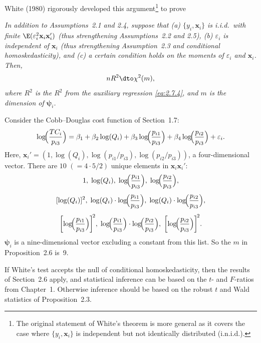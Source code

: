 White (1980) rigorously developed this argument\footnote{The original statement of
White's theorem is more general as it covers the case where $\{y_i, \mathbf{x}_i\}$ is
independent but not identically distributed (i.n.i.d.).} to prove

\begin{proposition}
\label{prop:2.6}
\emph{In addition to Assumptions~2.1 and 2.4, suppose that
\textup{(a)} $\{y_i, \mathbf{x}_i\}$ is i.i.d.\ with finite
$\E(\varepsilon_i^2 \mathbf{x}_i \mathbf{x}_i')$
\textup{(}thus strengthening Assumptions~2.2 and 2.5\textup{)},
\textup{(b)} $\varepsilon_i$ is independent of $\mathbf{x}_i$
\textup{(}thus strengthening Assumption~2.3 and conditional homoskedasticity\textup{)},
and \textup{(c)} a certain condition holds on the moments of $\varepsilon_i$ and
$\mathbf{x}_i$.  Then,}
\[
  nR^2 \dto \chi^2(m),
\]
\emph{where $R^2$ is the $R^2$ from the auxiliary regression \eqref{eq:2.7.4}, and $m$
is the dimension of $\bm{\psi}_i$.}
\end{proposition}

\begin{example}
\label{ex:2.7}
Consider the Cobb--Douglas cost function of Section~1.7:
\[
  \log\!\Bigl(\frac{TC_i}{p_{i3}}\Bigr)
    = \beta_1 + \beta_2 \log(Q_i) + \beta_3 \log\!\Bigl(\frac{p_{i1}}{p_{i3}}\Bigr)
    + \beta_4 \log\!\Bigl(\frac{p_{i2}}{p_{i3}}\Bigr) + \varepsilon_i.
\]
Here, $\mathbf{x}_i' = (1, \log(Q_i), \log(p_{i1}/p_{i3}), \log(p_{i2}/p_{i3}))$, a
four-dimensional vector.  There are $10$ $(= 4 \cdot 5/2)$ unique elements in
$\mathbf{x}_i \mathbf{x}_i'$:
\begin{gather*}
  1,\; \log(Q_i),\; \log\!\Bigl(\frac{p_{i1}}{p_{i3}}\Bigr),\;
    \log\!\Bigl(\frac{p_{i2}}{p_{i3}}\Bigr), \\[4pt]
  [\log(Q_i)]^2,\;
    \log(Q_i) \cdot \log\!\Bigl(\frac{p_{i1}}{p_{i3}}\Bigr),\;
    \log(Q_i) \cdot \log\!\Bigl(\frac{p_{i2}}{p_{i3}}\Bigr), \\[4pt]
  \biggl[\log\!\Bigl(\frac{p_{i1}}{p_{i3}}\Bigr)\biggr]^{\!2},\;
    \log\!\Bigl(\frac{p_{i1}}{p_{i3}}\Bigr)
      \cdot \log\!\Bigl(\frac{p_{i2}}{p_{i3}}\Bigr),\;
  \biggl[\log\!\Bigl(\frac{p_{i2}}{p_{i3}}\Bigr)\biggr]^{\!2}.
\end{gather*}
$\bm{\psi}_i$ is a nine-dimensional vector excluding a constant from this list.
So the $m$ in Proposition~2.6 is~9.
\end{example}

If White's test accepts the null of conditional homoskedasticity, then the results of
Section~2.6 apply, and statistical inference can be based on the $t$- and $F$-ratios from
Chapter~1.  Otherwise inference should be based on the robust $t$ and Wald statistics of
Proposition~2.3.

